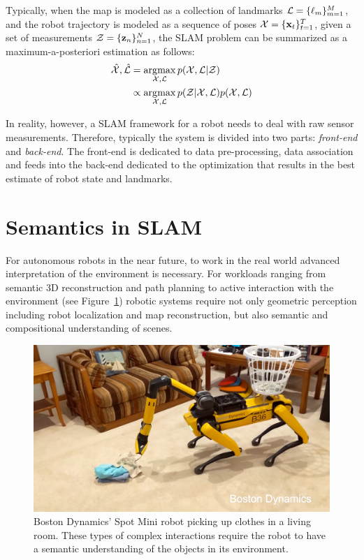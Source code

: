 Typically, when the map is modeled as a collection of landmarks $ \mathcal{L} = \{\ell_m\}_{m=1}^{M} $, and the robot trajectory is modeled as a sequence of poses $\mathcal{X} = \{\mathbf{x}_t\}_{t=1}^{T}$, given a set of measurements $ \mathcal{Z} = \{\mathbf{z}_n\}_{n=1}^{N}$, the SLAM problem can be summarized as a maximum-a-posteriori estimation \cite{dellaertFactorGraphsRobot2017} as follows:
\begin{align}
    \hat{\mathcal{X}}, \hat{\mathcal{L}} &= \operatorname*{\arg\!\max}_{\mathcal{X}, \mathcal{L}} p(\mathcal{X}, \mathcal{L} | \mathcal{Z}) \\
                         &\propto \operatorname*{\arg\!\max}_{\mathcal{X}, \mathcal{L}} p(\mathcal{Z} | \mathcal{X}, \mathcal{L}) p(\mathcal{X}, \mathcal{L})
\end{align}

In reality, however, a SLAM framework for a robot needs to deal with raw sensor measurements. Therefore, typically the system is divided into two parts: \emph{front-end} and \emph{back-end}. The front-end is dedicated to data pre-processing, data association and feeds into the back-end dedicated to the optimization that results in the best estimate of robot state and landmarks.

\section{Semantics in SLAM}

For autonomous robots in the near future, to work in the real world advanced interpretation of the environment is necessary. For workloads ranging from semantic 3D reconstruction and path planning to active interaction with the environment (see Figure~\ref{fig:spot-mini}) robotic systems require not only geometric perception including robot localization and map reconstruction, but also semantic and compositional understanding of scenes.

\begin{figure}[htpb]
    \centering
    \includegraphics[width=0.8\linewidth]{figs/Spots-Got-an-Arm.png}
    \caption{Boston Dynamics' Spot Mini robot picking up clothes in a living room. These types of complex interactions require the robot to have a semantic understanding of the objects in its environment.}%
    \label{fig:spot-mini}
\end{figure}

